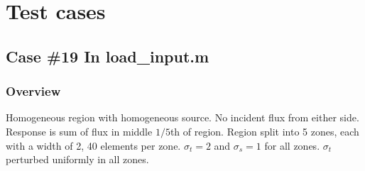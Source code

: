 \documentclass{article}
\begin{document}
\section{Test cases}
\subsection{Case \#19 In load\_input.m}
\subsubsection{Overview}
Homogeneous region with homogeneous source. No incident flux from either side. Response is sum of flux in middle $1/5$th of region. Region split into 5 zones, each with a width of 2, 40 elements per zone. $\sigma_t = 2$ and $\sigma_s=1$ for all zones. $\sigma_t$ perturbed uniformly in all zones.
\end{document}
